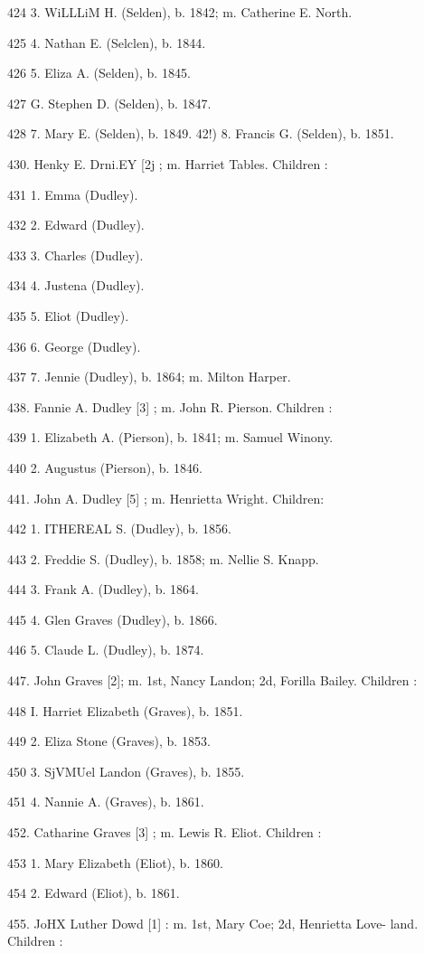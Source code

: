 \documentclass{book}
\begin{document}
424 3. WiLLLiM H. (Selden), b. 1842; m. Catherine E. North. 

425 4. Nathan E. (Selclen), b. 1844. 

426 5. Eliza A. (Selden), b. 1845. 

427 G. Stephen D. (Selden), b. 1847. 

428 7. Mary E. (Selden), b. 1849. 
42!) 8. Francis G. (Selden), b. 1851. 

430. Henky E. Drni.EY [2j ; m. Harriet Tables. Children : 

431 1. Emma (Dudley). 

432 2. Edward (Dudley). 

433 3. Charles (Dudley). 

434 4. Justena (Dudley). 

435 5. Eliot (Dudley). 

436 6. George (Dudley). 

437 7. Jennie (Dudley), b. 1864; m. Milton Harper. 

438. Fannie A. Dudley [3] ; m. John R. Pierson. Children : 

439 1. Elizabeth A. (Pierson), b. 1841; m. Samuel Winony. 

440 2. Augustus (Pierson), b. 1846. 

441. John A. Dudley [5] ; m. Henrietta Wright. Children: 

442 1. ITHEREAL S. (Dudley), b. 1856. 

443 2. Freddie S. (Dudley), b. 1858; m. Nellie S. Knapp. 

444 3. Frank A. (Dudley), b. 1864. 

445 4. Glen Graves (Dudley), b. 1866. 

446 5. Claude L. (Dudley), b. 1874. 

447. John Graves [2]; m. 1st, Nancy Landon; 2d, Forilla Bailey. 
Children : 

448 I. Harriet Elizabeth (Graves), b. 1851. 

449 2. Eliza Stone (Graves), b. 1853. 

450 3. SjVMUel Landon (Graves), b. 1855. 

451 4. Nannie A. (Graves), b. 1861. 

452. Catharine Graves [3] ; m. Lewis R. Eliot. Children : 

453 1. Mary Elizabeth (Eliot), b. 1860. 

454 2. Edward (Eliot), b. 1861. 

455. JoHX Luther Dowd [1] : m. 1st, Mary Coe; 2d, Henrietta Love- 
land. Children : 
\end{document}
